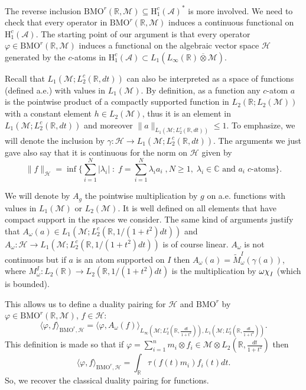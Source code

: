 \documentclass[psamsfonts]{amsart}
\newcommand{\R}{\mathbb{R}}
\newcommand{\C}{\mathbb{C}}
\newcommand*{\bigchi}{\mbox{\large$\chi$}}
\newcommand{\la}{\langle}
\newcommand{\ra}{\rangle}
\newcommand{\Lone}{L_1}
\newcommand{\Linfty}{L_\infty}
\newcommand{\Ltwo}{L_2}
\newcommand{\Ltwoc}{L_2^c}
\newcommand{\Ltwor}{L_2^r}
\newcommand{\Honec}{\mathrm{H}_1^c}
\newcommand{\BMOr}{\mathrm{BMO}^r}
\newcommand{\Hardyc}{\Honec(\mathcal{A})}
\newcommand{\Avnat}{\Linfty(\mathbb{R}) \overline{\otimes} \mathcal{M}}
\begin{document}
        The reverse inclusion $\BMOr(\mathbb{R},\mathcal{M}) \subseteq \Hardyc^*$ is more involved. We need to check that every operator in $\BMOr(\mathbb{R},\mathcal{M})$ induces a continuous functional on $\Hardyc$. The starting point of our argument is that every operator $\varphi \in \BMOr(\mathbb{R},\mathcal{M})$ induces a functional on the algebraic vector space $\mathcal H$ generated by the $c$-atoms in $\Hardyc\subset \Lone(\Avnat)$.

    Recall that $\Lone(\mathcal{M};\Ltwoc(\mathbb{R},dt))$ can also
    be interpreted as a space of functions (defined a.e.) with values
    in $\Lone(\mathcal M)$. By definition, as a function any $c$-atom
    $a$ is the pointwise product of a compactly supported function in
    $\Ltwo(\mathbb R;\Ltwo(\mathcal{M}))$ with a constant element
    $h\in \Ltwo(\mathcal{M})$, thus it is an element in
    $\Lone(\mathcal{M};\Ltwoc(\mathbb{R},dt))$ and moreover
    $\|a\|_{\Lone(\mathcal{M};\Ltwoc(\mathbb{R},dt))}\leq 1$. To
    emphasize, we will denote the inclusion by
    $\gamma: \mathcal H\to
    \Lone(\mathcal{M};\Ltwoc(\mathbb{R},dt))$. The arguments we just
    gave also say that it is continuous for the norm on $\mathcal H$
    given by
    $$\|f\|_{\mathcal H}= \inf\{ \sum_{i=1}^N |\lambda_i|  \; : \; f=\sum_{i=1}^N \lambda_i a_i \; , N\geq 1, \; \lambda_i\in \C \textrm{ and } a_i \; c\textrm{-atoms} \}.$$
 
    We will denote by $A_g$ the pointwise multiplication by $g$ on
    a.e. functions with values in $\Lone(\mathcal{M})$ or
    $\Ltwo(\mathcal{M})$. It is well defined on all elements that
    have compact support in the spaces we consider. The same kind of arguments justify that
    $A_\omega(a)\in \Lone(\mathcal{M};\Ltwoc(\mathbb{R},1/(1+t^2)dt))$
    and
    $A_\omega : \mathcal H\to
    \Lone(\mathcal{M};\Ltwoc(\mathbb{R},1/(1+t^2)dt))$ is of course
    linear. $A_\omega$ is not continuous but if $a$ is an atom supported on $I$
    then $A_\omega(a)=\widetilde M_\omega^I (\gamma(a))$, where $M_\omega^I: \Ltwo(\R)\to L_2(\R, 1/(1+t^2)dt)$ is the multiplication by $\omega\bigchi_I$ (which is bounded).


    This allows us to define a duality pairing for $\mathcal H$ and
    $\BMOr$ by $\varphi \in \BMOr(\mathbb{R},\mathcal{M})$, $f\in \mathcal H$:
$$\la \varphi, f\ra_{\BMOr,\mathcal H} =\langle
\varphi, A_\omega(f)
\rangle_{\Linfty(\mathcal{M};\Ltwor(\mathbb{R},\frac{dt}{1+t^2})),
  \Lone(\mathcal{M};\Ltwoc(\mathbb{R},\frac{dt}{1+t^2})) }.$$
This definition is made so that if
$\varphi=\sum_{i=1}^n m_i\otimes f_i \in \mathcal M\otimes \Ltwo(\mathbb{R},\frac{dt}{1+t^2})$ then
$$\la \varphi, f\ra_{\BMOr,\mathcal H} =\int_{\mathbb R}  \tau (f(t)m_i) f_i(t) dt.$$ 
So, we recover the classical duality pairing for functions.
    
\end{document}
